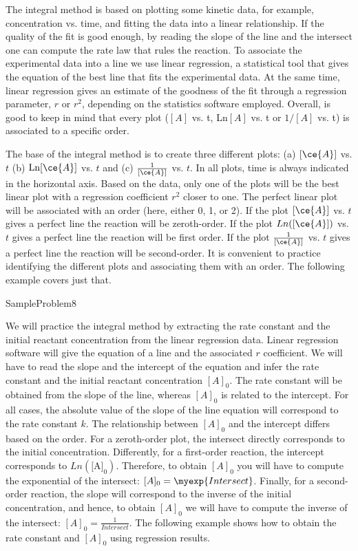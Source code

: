 \documentclass[main.tex]{subfiles}
\newcommand\chapterlabel{Ch-kinetics}
\begin{document}
\begin{description}
The integral method is based on plotting some kinetic data, for example, concentration vs. time, and fitting the data into a linear relationship.
If the quality of the fit is good enough, by reading the slope of the line and the intersect one can compute the rate law that rules the reaction.
To associate the experimental data into a line we use linear regression, a statistical tool that gives the equation of the best line that fits the experimental data. At the same time, linear regression gives an estimate of the goodness of the fit through a regression parameter, $r$ or $r^2$, depending on the statistics software employed.
Overall, is good to keep in mind that every plot ($[A]$ vs. t, Ln$[A]$ vs. t or $1/[A]$ vs. t) is associated to a specific order.  
\item[\docfilehook{The integral method: associating a linear plot with an order}{}] 
The base of the integral method is to create three different plots: (a) $[\ce{A}]$ vs. $t$ (b) $\text{Ln}[\ce{A}]$ vs. $t$ and (c) $\frac{1}{[\ce{A}]}$ vs. $t$. In all plots, time is always indicated in the horizontal axis. Based on the data, only one of the plots will be the best linear plot with a  regression coefficient $r^2$ closer to one. The perfect linear plot will be associated with an order (here, either 0, 1, or 2). If the plot $[\ce{A}]$ vs. $t$ gives a perfect line the reaction will be zeroth-order. If the plot $Ln([\ce{A}])$ vs. $t$ gives a perfect line the reaction will be first order. If the plot $\frac{1}{[\ce{A}]}$ vs. $t$ gives a perfect line the reaction will be second-order. It is convenient to practice identifying the different plots and associating them with an order. The following example covers just that.

  {SampleProblem8}


\item[\docfilehook{The integral method: extracting data from linear regressions}{}] 
We will practice the integral method by extracting the rate constant and the initial reactant concentration from the linear regression data. Linear regression software will give the equation of a line and the associated $r$ coefficient. We will have to read the slope and the intercept of the equation and infer the rate constant and the initial reactant concentration $[A]_0$.
The rate constant will be obtained from the slope of the line, whereas $[A]_0$ is related to the intercept.
For all cases, the absolute value of the slope of the line equation will correspond to the rate constant $k$. The relationship between $[A]_0$ and the intercept differs based on the order. For a zeroth-order plot, the intersect directly corresponds to the initial concentration. Differently, for a first-order reaction, the intercept corresponds to $Ln(\text{[A]}_0)$. Therefore, to obtain $[A]_0$ you will have to compute the exponential of the intersect: $[A]_0=\myexp{Intersect}$. Finally, for a second-order reaction, the slope will correspond to the inverse of the initial concentration, and hence, to obtain $[A]_0$ we will have to compute the inverse of the intersect: $[A]_0=\frac{1}{Intersect}$. The following example shows how to obtain the rate constant and $[A]_0$ using regression results.


\end{description}
\end{document}
